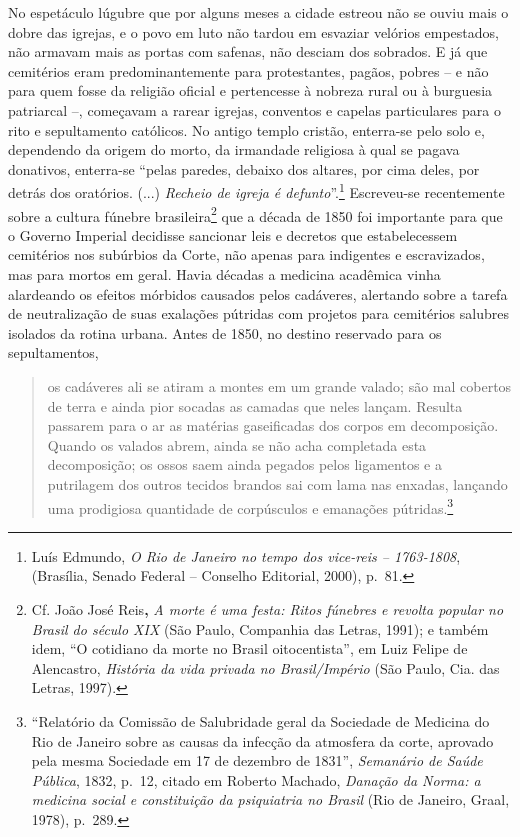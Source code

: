 No espetáculo lúgubre que por alguns meses a cidade estreou não se ouviu
mais o dobre das igrejas, e o povo em luto não tardou em esvaziar
velórios empestados, não armavam mais as portas com safenas, não desciam
dos sobrados. E já que cemitérios eram predominantemente para
protestantes, pagãos, pobres -- e não para quem fosse da religião
oficial e pertencesse à nobreza rural ou à burguesia patriarcal --,
começavam a rarear igrejas, conventos e capelas particulares para o rito
e sepultamento católicos. No antigo templo cristão, enterra-se pelo solo
e, dependendo da origem do morto, da irmandade religiosa à qual se
pagava donativos, enterra-se ``pelas paredes, debaixo dos altares, por
cima deles, por detrás dos oratórios. (...) \emph{Recheio de igreja é
defunto}''.\footnote{Luís Edmundo, \emph{O Rio de Janeiro no tempo dos
  vice-reis -- 1763-1808}, (Brasília, Senado Federal -- Conselho
  Editorial, 2000), p.~81.} Escreveu-se recentemente sobre a cultura
fúnebre brasileira\footnote{Cf. João José Reis\textbf{,} \emph{A morte é
  uma festa: Ritos fúnebres e revolta popular no Brasil do século XIX}
  (São Paulo, Companhia das Letras, 1991); e também idem, ``O cotidiano
  da morte no Brasil oitocentista'', em Luiz Felipe de Alencastro,
  \emph{História da vida privada no Brasil/Império} (São Paulo, Cia. das
  Letras, 1997).} que a década de 1850 foi importante para que o Governo
Imperial decidisse sancionar leis e decretos que estabelecessem
cemitérios nos subúrbios da Corte, não apenas para indigentes e
escravizados, mas para mortos em geral. Havia décadas a medicina
acadêmica vinha alardeando os efeitos mórbidos causados pelos cadáveres,
alertando sobre a tarefa de neutralização de suas exalações pútridas com
projetos para cemitérios salubres isolados da rotina urbana. Antes de
1850, no destino reservado para os sepultamentos,

\begin{quote}
os cadáveres ali se atiram a montes em um grande valado; são mal
cobertos de terra e ainda pior socadas as camadas que neles lançam.
Resulta passarem para o ar as matérias gaseificadas dos corpos em
decomposição. Quando os valados abrem, ainda se não acha completada esta
decomposição; os ossos saem ainda pegados pelos ligamentos e a
putrilagem dos outros tecidos brandos sai com lama nas enxadas, lançando
uma prodigiosa quantidade de corpúsculos e emanações pútridas.\footnote{``Relatório
  da Comissão de Salubridade geral da Sociedade de Medicina do Rio de
  Janeiro sobre as causas da infecção da atmosfera da corte, aprovado
  pela mesma Sociedade em 17 de dezembro de 1831'', \emph{Semanário de
  Saúde Pública}, 1832, p.~12, citado em Roberto Machado, \emph{Danação
  da Norma: a medicina social e constituição da psiquiatria no Brasil}
  (Rio de Janeiro, Graal, 1978), p.~289.}
\end{quote}

